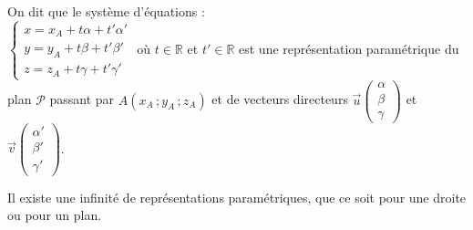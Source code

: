 \documentclass{cornouaille}
\begin{document}
\begin{definition}
  On dit que le système d'équations :
  \\$\begin{cases}x=x_A+t\alpha+t'\alpha'
    \\y=y_A+t\beta +t'\beta' \\z=z_A+t\gamma +t'\gamma'
  \end{cases}$ où $t\in\mathbb{R}$ et
  $t'\in\mathbb{R}$
  est une représentation paramétrique du plan $\mathcal{P}$
  passant par $A(x_A\,;y_A\,;z_A)$ et de vecteurs directeurs $\vec{u}
  \begin {pmatrix} \alpha\\\beta\\\gamma \end{pmatrix}$ et
  $\vec{v} \begin {pmatrix} \alpha'\\\beta'\\\gamma' \end{pmatrix}$.
\end{definition}



\begin{remarque}
  Il existe une infinité de représentations paramétriques, que ce soit
  pour une droite ou pour un plan.
\end{remarque}
\end{document}
